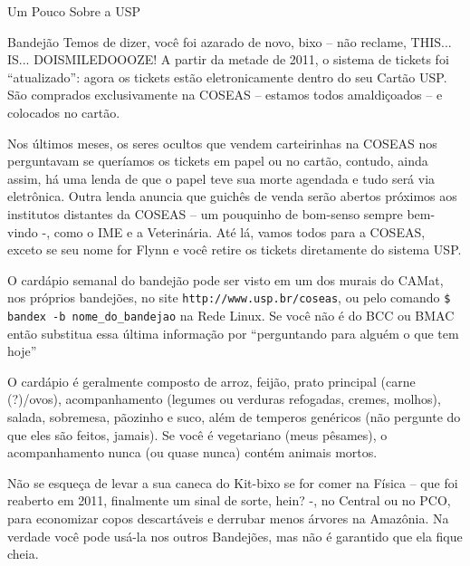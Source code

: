 \begin{secao}{Um Pouco Sobre a USP}
\begin{subsecao}{Bandejão}
Temos de dizer, você foi azarado de novo, bixo – não reclame, THIS... IS... DOISMILEDOOOZE! A partir da metade de 2011, o sistema de tickets foi “atualizado”: agora os tickets estão eletronicamente dentro do seu Cartão USP. São comprados exclusivamente na COSEAS – estamos todos amaldiçoados – e colocados no cartão. 

Nos últimos meses, os seres ocultos que vendem carteirinhas na COSEAS nos perguntavam se queríamos os tickets em papel ou no cartão, contudo, ainda assim, há uma lenda de que o papel teve sua morte agendada e tudo será via eletrônica. Outra lenda anuncia que guichês de venda serão abertos próximos aos institutos distantes da COSEAS – um pouquinho de bom-senso sempre bem-vindo -, como o IME e a Veterinária. Até lá, vamos todos para a COSEAS, exceto se seu nome for Flynn e você retire os tickets diretamente do sistema USP. 

O cardápio semanal do bandejão pode ser visto em um dos murais do CAMat, nos próprios bandejões, no site {\tt http://www.usp.br/coseas}, ou pelo comando {\tt \$ bandex -b nome\_do\_bandejao} na Rede Linux. Se você não é do BCC ou BMAC então substitua essa última informação por “perguntando para alguém o que tem hoje”

O cardápio é geralmente composto de arroz, feijão, prato principal (carne (?)/ovos), acompanhamento (legumes ou verduras refogadas, cremes, molhos), salada, sobremesa, pãozinho e suco, além de temperos genéricos (não pergunte do que eles são feitos, jamais). Se você é vegetariano (meus pêsames), o acompanhamento nunca (ou quase nunca) contém animais mortos.

Não se esqueça de levar a sua caneca do Kit-bixo se for comer na Física – que foi reaberto em 2011, finalmente um sinal de sorte, hein? -, no Central ou no PCO, para economizar copos descartáveis e derrubar menos árvores na Amazônia. Na verdade você pode usá-la nos outros Bandejões, mas não é garantido que ela fique cheia. 


\end{subsecao}
\end{secao}
